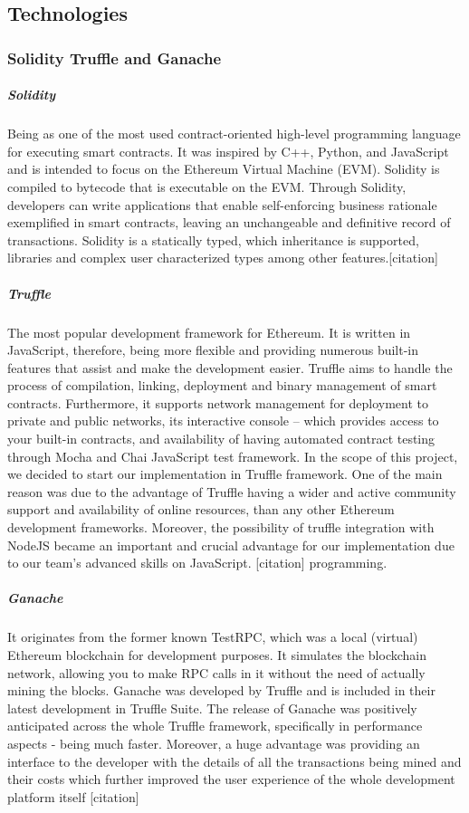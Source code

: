 \subsection{Technologies} \label{sssec:technologies}


\subsubsection{Solidity Truffle and Ganache}


\subparagraph{Solidity}
Being as one of the most used contract-oriented high-level programming language for executing smart contracts. It was inspired by C++, Python, and JavaScript and is intended to focus on the Ethereum Virtual Machine (EVM). Solidity is compiled to bytecode that is executable on the EVM. Through Solidity, developers can write applications that enable self-enforcing business rationale exemplified in smart contracts, leaving an unchangeable and definitive record of transactions. Solidity is a statically typed, which inheritance is supported, libraries and complex user characterized types among other features.[citation]

\subparagraph{Truffle}
The most popular development framework for Ethereum. It is written in JavaScript, therefore, being more flexible and providing numerous built-in features that assist and make the development easier. Truffle aims to handle the process of compilation, linking, deployment and binary management of smart contracts. Furthermore, it supports network management for deployment to private and public networks, its interactive console – which provides access to your built-in contracts, and availability of having automated contract testing through Mocha and Chai JavaScript test framework. In the scope of this project, we decided to start our implementation in Truffle framework. One of the main reason was due to the advantage of Truffle having a wider and active community support and availability of online resources, than any other Ethereum development frameworks. Moreover, the possibility of truffle integration with NodeJS became an important and crucial advantage for our implementation due to our team’s advanced skills on JavaScript. [citation] programming.

\subparagraph{Ganache}
It originates from the former known TestRPC,  which was a local (virtual) Ethereum blockchain for development purposes. It simulates the blockchain network, allowing you to make RPC calls in it without the need of actually mining the blocks. Ganache was developed by Truffle and is included in their latest development in Truffle Suite. The release of Ganache was positively anticipated across the whole Truffle framework, specifically in performance aspects - being much faster. Moreover, a huge advantage was providing an interface to the developer with the details of all the transactions being mined and their costs which further improved the user experience of the whole development platform itself [citation]


